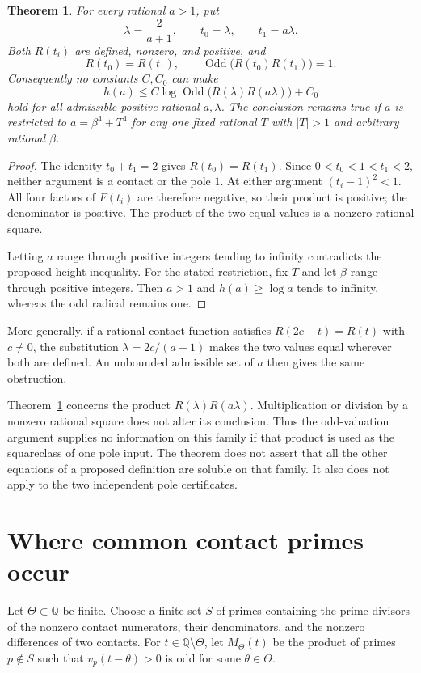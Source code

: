 \documentclass[11pt,a4paper]{article}
\newtheorem{theorem}{Theorem}[section]
\newcommand{\Q}{\mathbb Q}
\begin{document}
\begin{theorem}\label{thm:symmetric}
For every rational $a>1$, put
\[
             \lambda=\frac2{a+1},\qquad
             t_0=\lambda,\qquad t_1=a\lambda.
\]
Both $R(t_i)$ are defined, nonzero, and positive, and
\[
              R(t_0)=R(t_1),\qquad
              \operatorname{Odd}\bigl(R(t_0)R(t_1)\bigr)=1.
\]
Consequently no constants $C,C_0$ can make
\[
       h(a)\le C\log\operatorname{Odd}
                    \bigl(R(\lambda)R(a\lambda)\bigr)+C_0
\]
hold for all admissible positive rational $a,\lambda$.
The conclusion remains true if $a$ is restricted to
$a=\beta^4+T^4$ for any one fixed rational $T$ with $|T|>1$
and arbitrary rational $\beta$.
\end{theorem}
\begin{proof}
The identity $t_0+t_1=2$ gives $R(t_0)=R(t_1)$.
Since $0<t_0<1<t_1<2$, neither argument is a contact or
the pole $1$. At either argument $(t_i-1)^2<1$.
All four factors of $F(t_i)$ are therefore negative,
so their product is positive; the denominator is positive.
The product of the two equal values is a nonzero rational square.

Letting $a$ range through positive integers tending to infinity
contradicts the proposed height inequality. For the stated
restriction, fix $T$ and let $\beta$ range through positive
integers. Then $a>1$ and $h(a)\ge\log a$ tends to infinity,
whereas the odd radical remains one.
\end{proof}

More generally, if a rational contact function satisfies
$R(2c-t)=R(t)$ with $c\ne0$, the substitution
$\lambda=2c/(a+1)$ makes the two values equal wherever both
are defined. An unbounded admissible set of $a$ then gives
the same obstruction.

Theorem~\ref{thm:symmetric} concerns the product
$R(\lambda)R(a\lambda)$. Multiplication or division by a
nonzero rational square does not alter its conclusion.
Thus the odd-valuation argument supplies no information on this
family if that product is used as the squareclass of one pole
input. The theorem does not assert that all the other equations
of a proposed definition are soluble on that family. It also
does not apply to the two independent pole certificates.

\section{Where common contact primes occur}

Let $\Theta\subset\Q$ be finite. Choose a finite set $S$ of primes
containing the prime divisors of the nonzero contact numerators,
their denominators, and the nonzero differences of two contacts.
For $t\in\Q\setminus\Theta$, let $M_\Theta(t)$ be the product
of primes $p\notin S$ such that $v_p(t-\theta)>0$ is odd
for some $\theta\in\Theta$.
\end{document}
